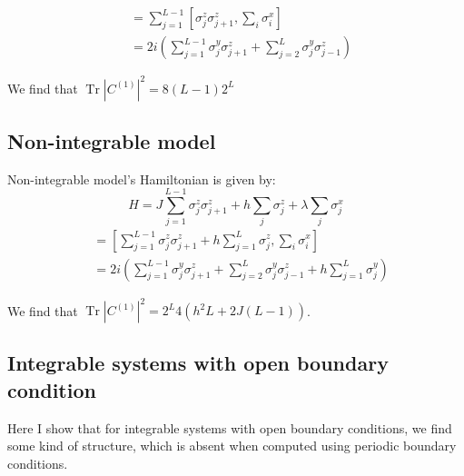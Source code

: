 \documentclass[11pt,a4paper]{article}
\DeclareMathOperator{\Tr}{Tr}
\begin{document}
\begin{align*}
[H,\partial_{\lambda}H] & = \sum_{j=1}^{L-1} [\sigma_j^z \sigma_{j+1}^z , \sum_{i} \sigma_i^x]  \\
&= 2i \left(\sum_{j=1}^{L-1} \sigma_j^y \sigma_{j+1}^z + \sum_{j=2}^{L} \sigma_j^y \sigma_{j-1}^z\right)
\end{align*}

We find that $\Tr |C^{(1)}|^2 = 8 (L-1)2^L$ 

\subsection{Non-integrable model}
Non-integrable model's Hamiltonian is given by: 
\begin{equation}
H= J \sum_{j=1}^{L-1} \sigma_j^z \sigma_{j+1}^z + h\sum_{j} \sigma_j^z +\lambda \sum_{j} \sigma_j^x 
\end{equation}
\begin{align*}
[H,\partial_{\lambda}H] & =  [\sum_{j=1}^{L-1} \sigma_j^z \sigma_{j+1}^z + h\sum_{j=1}^{L} \sigma_j^z, \sum_{i} \sigma_i^x]  \\
&= 2i \left(\sum_{j=1}^{L-1} \sigma_j^y \sigma_{j+1}^z + \sum_{j=2}^{L} \sigma_j^y \sigma_{j-1}^z + h \sum_{j=1}^{L}\sigma_j^y \right) 
\end{align*}


We find that $\Tr |C^{(1)}|^2 = 2^L 4(h^2 L + 2J(L-1))$. 
 

\subsection{Integrable systems with open boundary condition}

Here I show that for integrable systems with open boundary conditions, we find some kind of structure, which is absent when computed using periodic boundary conditions.
\end{document}
